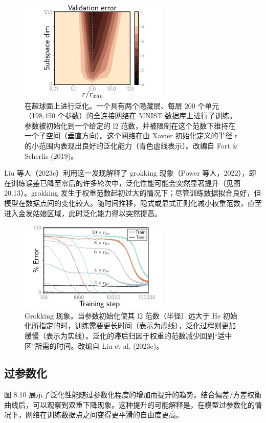 \begin{figure}[ht!]
\centering
\includegraphics[width=0.7\linewidth]{png/chapter20/WhyGoldilocks2.png}
\caption{在超球面上进行泛化。一个具有两个隐藏层、每层 200 个单元（198,450 个参数）的全连接网络在 MNIST 数据库上进行了训练。参数被初始化到一个给定的 l2 范数，并被限制在这个范数下维持在一个子空间（垂直方向）。这个网络在由 Xavier 初始化定义的半径 r 的小范围内表现出良好的泛化能力（青色虚线表示）。改编自 Fort \& Scherlis (2019)。}
\end{figure}

Liu 等人（2023c）利用这一发现解释了 grokking 现象（Power 等人，2022），即在训练误差已降至零后的许多轮次中，泛化性能可能会突然显著提升（见图 20.13）。grokking 发生于权重范数起初过大的情况下；尽管训练数据拟合良好，但模型在数据点间的变化较大。随时间推移，隐式或显式正则化减小权重范数，直至进入金发姑娘区域，此时泛化能力得以突然提高。

\begin{figure}[ht!]
\centering
\includegraphics[width=0.7\linewidth]{png/chapter20/WhyOmniGrok3.png}
\caption{Grokking 现象。当参数初始化使其 l2 范数（半径）远大于 He 初始化所指定的时，训练需要更长时间（表示为虚线），泛化过程则更加缓慢（表示为实线）。泛化的滞后归因于权重的范数减少回到“适中区”所需的时间。改编自 Liu et al. (2023c)。}
\end{figure}

\subsection{过参数化}
图 8.10 展示了泛化性能随过参数化程度的增加而提升的趋势。结合偏差/方差权衡曲线后，可以观察到双重下降现象。这种提升的可能解释是，在模型过参数化的情况下，网络在训练数据点之间变得更平滑的自由度更高。


